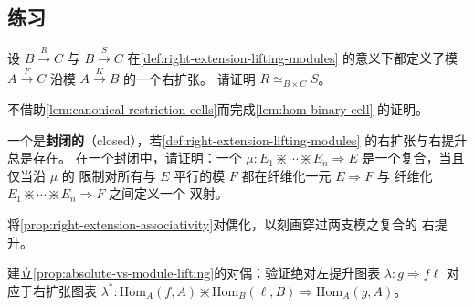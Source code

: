 \subsection*{练习}

\begin{exercise}\label{ex:uniqueness-right-extensions}
设 $B\xrightarrow{R}C$ 与 $B\xrightarrow{S}C$ 在\cref{def:right-extension-lifting-modules}
的意义下都定义了模 $A\xrightarrow{F}C$ 沿模 $A\xrightarrow{K}B$ 的一个右扩张。
请证明 $R\simeq_{B\times C}S$。
\end{exercise}

\begin{exercise}\label{ex:hom-cell-universal-properties}
不借助\cref{lem:canonical-restriction-cells}而完成\cref{lem:hom-binary-cell}
的证明。
\end{exercise}

\begin{exercise}\label{ex:closed-virtual-equipment}
一个\trVirtualEquipment{}是\textbf{封闭的}（closed），若\cref{def:right-extension-lifting-modules}
的右扩张与右提升总是存在。
在一个封闭\trVirtualEquipment{}中，请证明：一个\trCell{}
$\mu\colon E_{1}\divideontimes\cdots\divideontimes E_{n}\Rightarrow E$ 是一个复合，当且仅当沿 $\mu$ 的
限制对所有与 $E$ 平行的模 $F$ 都在纤维化一元\trCell{} $E\Rightarrow F$ 与
纤维化\trCell{} $E_{1}\divideontimes\cdots\divideontimes E_{n}\Rightarrow F$ 之间定义一个
双射。
\end{exercise}

\begin{exercise}\label{ex:right-liftings-through-composite}
将\cref{prop:right-extension-associativity}对偶化，以刻画穿过两支模之复合的
右提升。
\end{exercise}

\begin{exercise}\label{ex:dual-absolute-left-lifting}
建立\cref{prop:absolute-vs-module-lifting}的对偶：验证绝对左提升图表
$\lambda\colon g\Rightarrow f\ell$ 对应于右扩张图表
$\lambda^{*}\colon\mathrm{Hom}_{A}(f,A)\divideontimes \mathrm{Hom}_{B}(\ell,B)\Rightarrow\mathrm{Hom}_{A}(g,A)$。
\end{exercise}

